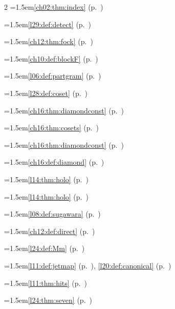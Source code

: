 \begin{multicols}{2}
\hangindent=1.5em\quad \ref{ch02:thm:index} (p.~\pageref{ch02:thm:index})\par
\hangindent=1.5em\quad \ref{l29:def:detect} (p.~\pageref{l29:def:detect})\par
\hangindent=1.5em\quad \ref{ch12:thm:fock} (p.~\pageref{ch12:thm:fock})\par
\hangindent=1.5em\quad \ref{ch10:def:blockF} (p.~\pageref{ch10:def:blockF})\par
\hangindent=1.5em\quad \ref{l06:def:partgram} (p.~\pageref{l06:def:partgram})\par
\hangindent=1.5em\quad \ref{l28:def:coset} (p.~\pageref{l28:def:coset})\par
\hangindent=1.5em\quad \ref{ch16:thm:diamondconst} (p.~\pageref{ch16:thm:diamondconst})\par
\hangindent=1.5em\quad \ref{ch16:thm:cosets} (p.~\pageref{ch16:thm:cosets})\par
\hangindent=1.5em\quad \ref{ch16:thm:diamondconst} (p.~\pageref{ch16:thm:diamondconst})\par
\hangindent=1.5em\quad \ref{ch16:def:diamond} (p.~\pageref{ch16:def:diamond})\par
\hangindent=1.5em\quad \ref{l14:thm:holo} (p.~\pageref{l14:thm:holo})\par
\hangindent=1.5em\quad \ref{l14:thm:holo} (p.~\pageref{l14:thm:holo})\par
\hangindent=1.5em\quad \ref{l08:def:sugawara} (p.~\pageref{l08:def:sugawara})\par
\hangindent=1.5em\quad \ref{ch12:def:direct} (p.~\pageref{ch12:def:direct})\par
\hangindent=1.5em\quad \ref{l24:def:Mm} (p.~\pageref{l24:def:Mm})\par
\hangindent=1.5em\quad \ref{l11:def:jetmap} (p.~\pageref{l11:def:jetmap}), \ref{l20:def:canonical} (p.~\pageref{l20:def:canonical})\par
\hangindent=1.5em\quad \ref{l11:thm:hits} (p.~\pageref{l11:thm:hits})\par
\hangindent=1.5em\quad \ref{l24:thm:seven} (p.~\pageref{l24:thm:seven})\par

\end{multicols}
